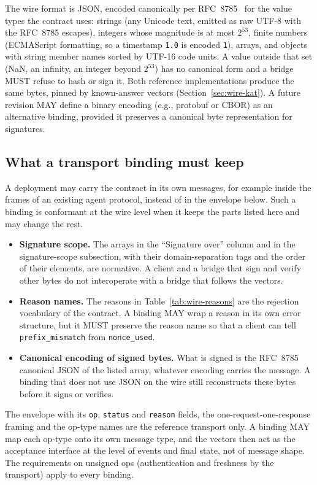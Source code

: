 The wire format is JSON, encoded canonically per RFC~8785~\cite{rundgren2020json}
for the value types the contract uses: strings (any Unicode text, emitted
as raw UTF-8 with the RFC~8785 escapes), integers whose magnitude is at
most $2^{53}$, finite numbers (ECMAScript formatting, so a timestamp
\texttt{1.0} is encoded \texttt{1}), arrays, and objects with string
member names sorted by UTF-16 code units. A value outside that set (NaN,
an infinity, an integer beyond $2^{53}$) has no canonical form and a
bridge MUST refuse to hash or sign it. Both reference implementations
produce the same bytes, pinned by known-answer vectors
(Section~\ref{sec:wire-kat}).
A future revision MAY define a binary encoding (e.g., protobuf or
CBOR) as an alternative binding, provided it preserves a canonical
byte representation for signatures.

\subsection{What a transport binding must keep}
\label{sec:wire-binding}

A deployment may carry the contract in its own messages, for example
inside the frames of an existing agent protocol, instead of in the
envelope below. Such a binding is conformant at the wire level when it
keeps the parts listed here and may change the rest.
\begin{itemize}[leftmargin=2em]
\item \textbf{Signature scope.} The arrays in the ``Signature over''
column and in the signature-scope subsection, with their
domain-separation tags and the order of their elements, are normative.
A client and a bridge that sign and verify other bytes do not
interoperate with a bridge that follows the vectors.
\item \textbf{Reason names.} The reasons in Table~\ref{tab:wire-reasons}
are the rejection vocabulary of the contract. A binding MAY wrap a
reason in its own error structure, but it MUST preserve the reason name
so that a client can tell \texttt{prefix\_mismatch} from
\texttt{nonce\_used}.
\item \textbf{Canonical encoding of signed bytes.} What is signed is the
RFC~8785 canonical JSON of the listed array, whatever encoding carries
the message. A binding that does not use JSON on the wire still
reconstructs these bytes before it signs or verifies.
\end{itemize}
The envelope with its \texttt{op}, \texttt{status} and \texttt{reason}
fields, the one-request-one-response framing and the op-type names are
the reference transport only. A binding MAY map each op-type onto its
own message type, and the vectors then act as the acceptance interface
at the level of events and final state, not of message shape. The
requirements on unsigned ops (authentication and freshness by the
transport) apply to every binding.

